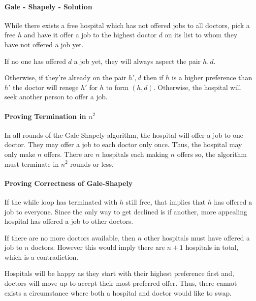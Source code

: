 \paragraph{Gale - Shapely - Solution}

While there exists a free hospital which has not offered jobs to all doctors,
pick a free \(h\) and have it offer a job to the highest doctor \(d\) on its list to whom they have not offered a job yet.

If no one has offered \(d\) a job yet, they will always aspect the pair \(h, d\).

Otherwise, if they're already on the pair \(h', d\) then if \(h\) is a higher preference than \(h'\) the doctor will renege \(h'\) for \(h\) to form \((h, d)\). Otherwise, the hospital will seek another person to offer a job.

\paragraph{Proving Termination in \(n^2\)}
In all rounds of the Gale-Shapely algorithm, the hospital will offer a job to one doctor. They may offer a job to each doctor only once. Thus, the hospital may only make \(n\) offers. There are \(n\) hospitals each making \(n\) offers so, the algorithm must terminate in \(n^2\) rounds or less.

\paragraph{Proving Correctness of Gale-Shapely}

If the while loop has terminated with \(h\) still free, that implies that
\(h\) has offered a job to everyone. Since the only way to get declined is
if another, more appealing hospital has offered a job to other doctors.  

If there are no more doctors available, then \(n\) other hospitals must
have offered a job to \(n\) doctors. However this would imply there are
\(n + 1\) hospitals in total, which is a contradiction.

Hospitals will be happy as they start with their highest preference first and,
doctors will move up to accept their most preferred offer. Thus, there cannot exists a circumstance where both a hospital and doctor would like to swap.
